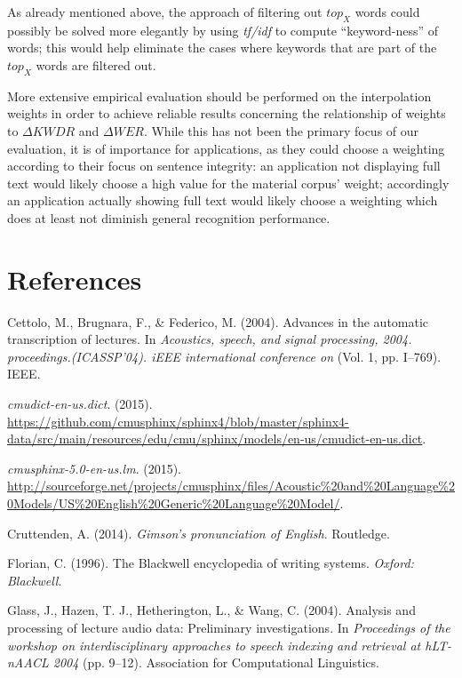 \documentclass[]{article}
\begin{document}
As already mentioned above, the approach of filtering out \(top_X\)
words could possibly be solved more elegantly by using \emph{tf/idf} to
compute ``keyword-ness'' of words; this would help eliminate the cases
where keywords that are part of the \(top_X\) words are filtered out.

More extensive empirical evaluation should be performed on the
interpolation weights in order to achieve reliable results concerning
the relationship of weights to \(\Delta KWDR\) and \(\Delta WER\). While
this has not been the primary focus of our evaluation, it is of
importance for applications, as they could choose a weighting according
to their focus on sentence integrity: an application not displaying full
text would likely choose a high value for the material corpus' weight;
accordingly an application actually showing full text would likely
choose a weighting which does at least not diminish general recognition
performance.

\section*{References}\label{references}

Cettolo, M., Brugnara, F., \& Federico, M. (2004). Advances in the
automatic transcription of lectures. In \emph{Acoustics, speech, and
signal processing, 2004. proceedings.(ICASSP'04). iEEE international
conference on} (Vol. 1, pp. I--769). IEEE.

\emph{cmudict-en-us.dict}. (2015).
\url{https://github.com/cmusphinx/sphinx4/blob/master/sphinx4-data/src/main/resources/edu/cmu/sphinx/models/en-us/cmudict-en-us.dict}.

\emph{cmusphinx-5.0-en-us.lm}. (2015).
\url{http://sourceforge.net/projects/cmusphinx/files/Acoustic\%20and\%20Language\%20Models/US\%20English\%20Generic\%20Language\%20Model/}.

Cruttenden, A. (2014). \emph{Gimson's pronunciation of English}.
Routledge.

Florian, C. (1996). The Blackwell encyclopedia of writing systems.
\emph{Oxford: Blackwell}.

Glass, J., Hazen, T. J., Hetherington, L., \& Wang, C. (2004). Analysis
and processing of lecture audio data: Preliminary investigations. In
\emph{Proceedings of the workshop on interdisciplinary approaches to
speech indexing and retrieval at hLT-nAACL 2004} (pp. 9--12).
Association for Computational Linguistics.
\end{document}
